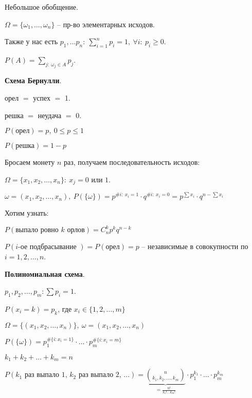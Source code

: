 \begin{remark}
    Небольшое обобщение.

    $\Omega = \{ \omega_1, \dots, \omega_n \}$ -- пр-во элементарных исходов.

    Также у нас есть $p_1, \dots p_n: \ \sum_{i=1}^{n} p_i = 1, \ \forall i: \ p_i \geq 0$.

    $P(A) = \sum_{j: \ \omega_j \in A} p_j$.
\end{remark}

\begin{theorem}
    \textbf{Схема Бернулли}.

    орел $=$ успех $=$ 1.

    решка $=$ неудача $=$ 0.

    $P(\text{орел}) = p, \ 0 \leq p \leq 1$

    $P(\text{решка}) = 1 - p$

    Бросаем монету $n$ раз, получаем последовательность исходов:

    $\Omega = \{ x_1, x_2, \dots, x_n \}: \ x_j = 0 \text{ или } 1$.

    $\omega = (x_1, x_2, \dots, x_n), \ P(\{ \omega \}) = p^{\# i: \ x_i = 1} \cdot q^{\# i: \ x_i = 0} = p^{\sum x_i} \cdot q^{n - \sum x_i}$

    Хотим узнать:

    $P(\text{выпало ровно } k \text{ орлов}) = C_{n}^{k} p^k q^{n - k}$

    $P(i\text{-ое подбрасывание }) = P(\text{орел}) = p$ -- независимые в совокупности по $i = 1, 2, \dots, n$.
\end{theorem}

\begin{theorem}
    \textbf{Полиномиальная схема}.

    $p_1, p_2, \dots, p_m: \sum p_i = 1$.

    $P(x_i = k) = p_k$, где $x_i \in \{ 1, 2, \dots, m \}$

    $\Omega = \{(x_1, x_2, \dots, x_n)\}, \ \omega = (x_1, x_2, \dots, x_n)$

    $P(\{ \omega \}) = p_1^{\# \{ i: x_i = 1 \}} \cdot \dots \cdot p_m^{\# \{ i: x_i = m \}}$

    $k_1 + k_2 + \dots + k_m = n$


    $P(k_1 \text{ раз выпало 1, } k_2 \text{ раз выпало 2, ...}) = \underbrace{\binom{n}{k_1, k_2, \dots, k_m}}_{= \frac{n!}{k_1! \dots k_m!}} \cdot p_1^{k_1} \cdot \dots \cdot p_m^{k_m}$
\end{theorem}

